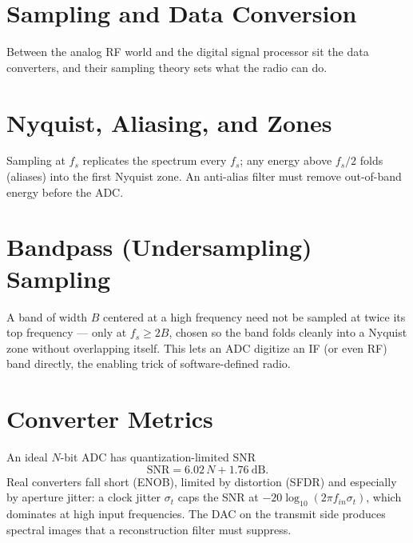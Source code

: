 \section{Sampling and Data Conversion}\label{sec:tb_sampling}



Between the analog RF world and the digital signal processor sit the
data converters, and their sampling theory sets what the radio can do.

\section{Nyquist, Aliasing, and Zones}
Sampling at $f_s$ replicates the spectrum every $f_s$; any energy above $f_s/2$
folds (aliases) into the first Nyquist zone. An anti-alias filter must remove
out-of-band energy before the ADC.

\section{Bandpass (Undersampling) Sampling}
A band of width $B$ centered at a high frequency need not be sampled at twice its
top frequency --- only at $f_s \ge 2B$, chosen so the band folds cleanly into a
Nyquist zone without overlapping itself. This lets an ADC digitize an IF (or even
RF) band directly, the enabling trick of software-defined radio.

\section{Converter Metrics}
An ideal $N$-bit ADC has quantization-limited SNR
\[ \text{SNR} = 6.02\,N + 1.76\ \text{dB}. \]
Real converters fall short (ENOB), limited by distortion (SFDR) and especially by
aperture jitter: a clock jitter $\sigma_t$ caps the SNR at
$-20\log_{10}(2\pi f_{in}\sigma_t)$, which dominates at high input frequencies.
The DAC on the transmit side produces spectral images that a reconstruction
filter must suppress.



